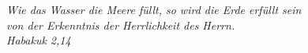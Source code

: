 \vspace*{\fill}
\begin{center}
\begin{Large}
\textit{Wie das Wasser die Meere füllt, so wird die Erde erfüllt sein}\\
\textit{von der Erkenntnis der Herrlichkeit des Herrn.}\\
\vspace{10px}
\textit{Habakuk 2,14}
\end{Large}
\end{center}
\vspace*{\fill}